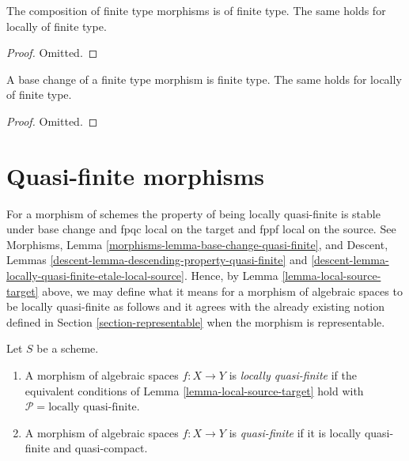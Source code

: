 \begin{lemma}
\label{lemma-composition-finite-type}
The composition of finite type morphisms is of finite type.
The same holds for locally of finite type.
\end{lemma}

\begin{proof}
Omitted.
\end{proof}

\begin{lemma}
\label{lemma-base-change-finite-type}
A base change of a finite type morphism is finite type.
The same holds for locally of finite type.
\end{lemma}

\begin{proof}
Omitted.
\end{proof}








\section{Quasi-finite morphisms}
\label{section-quasi-finite}

\noindent
For a morphism of schemes the property of being locally quasi-finite is
stable under base change and fpqc local on
the target and fppf local on the source. See
Morphisms, Lemma \ref{morphisms-lemma-base-change-quasi-finite}, and
Descent, Lemmas \ref{descent-lemma-descending-property-quasi-finite} and
\ref{descent-lemma-locally-quasi-finite-etale-local-source}.
Hence, by
Lemma \ref{lemma-local-source-target}
above, we may define what it means for a morphism of algebraic spaces
to be locally quasi-finite as
follows and it agrees with the already existing notion defined in
Section \ref{section-representable}
when the morphism is representable.

\begin{definition}
\label{definition-locally-quasi-finite}
Let $S$ be a scheme.
\begin{enumerate}
\item A morphism of algebraic spaces $f : X \to Y$ is
{\it locally quasi-finite} if the equivalent conditions of
Lemma \ref{lemma-local-source-target} hold with
$\mathcal{P} = \text{locally quasi-finite}$.
\item A morphism of  algebraic spaces $f : X \to Y$ is
{\it quasi-finite} if it is locally quasi-finite and quasi-compact.
\end{enumerate}
\end{definition}

